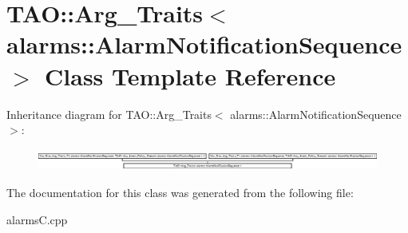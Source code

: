 \section{T\+AO\+:\+:Arg\+\_\+\+Traits$<$ alarms\+:\+:Alarm\+Notification\+Sequence $>$ Class Template Reference}
\label{classTAO_1_1Arg__Traits_3_01alarms_1_1AlarmNotificationSequence_01_4}
Inheritance diagram for T\+AO\+:\+:Arg\+\_\+\+Traits$<$ alarms\+:\+:Alarm\+Notification\+Sequence $>$\+:\begin{figure}[H]
\begin{center}
\leavevmode
\includegraphics[height=0.717949cm]{classTAO_1_1Arg__Traits_3_01alarms_1_1AlarmNotificationSequence_01_4}
\end{center}
\end{figure}


The documentation for this class was generated from the following file\+:\begin{DoxyCompactItemize}
\item 
alarms\+C.\+cpp\end{DoxyCompactItemize}
